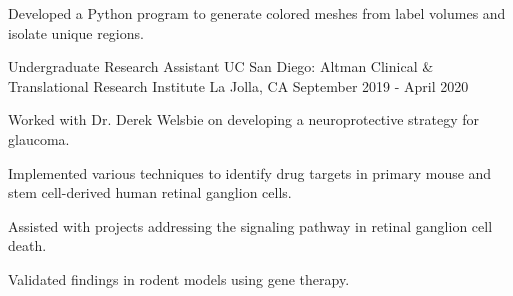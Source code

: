 \begin{cventries}
{\begin{cvitems}
    \item {Developed a Python program to generate colored meshes from label volumes and isolate unique regions.}
  \end{cvitems}
}
\cventry
{Undergraduate Research Assistant} %
{UC San Diego: Altman Clinical \& Translational Research Institute} %
{La Jolla, CA} %
{September 2019 - April 2020} %
{
  \begin{cvitems} %
    \item {Worked with Dr. Derek Welsbie on developing a neuroprotective strategy for glaucoma.}
    \item {Implemented various techniques to identify drug targets in primary mouse and stem cell-derived human retinal ganglion cells.}
    \item {Assisted with projects addressing the signaling pathway in retinal ganglion cell death.}
    \item {Validated findings in rodent models using gene therapy.}
  \end{cvitems}
}
\end{cventries}
